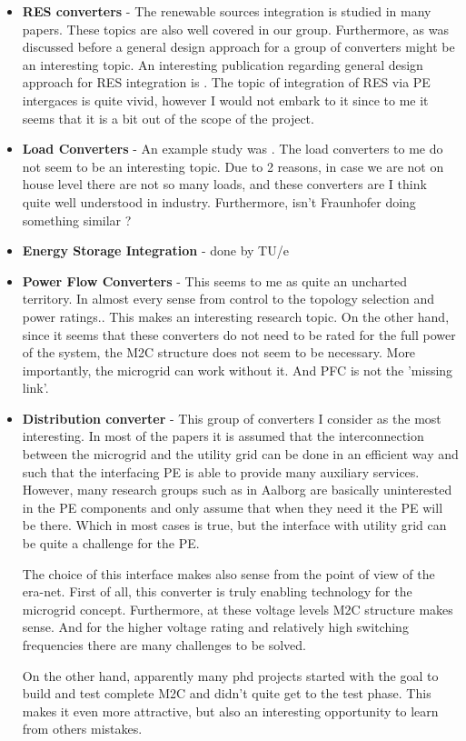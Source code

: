 \documentclass[]{scrartcl}
\begin{document}
\begin{itemize}
	\item \textbf{RES converters} - The renewable sources integration is  studied in many papers. These topics are also well covered in our group. Furthermore, as was discussed before a general design approach for a group of converters might be an interesting topic. An interesting publication regarding general design approach for RES integration is \cite{Ortjohann2009}. The topic of integration of RES via PE intergaces is quite vivid, however I would not embark to it since to me it seems that it is a bit out of the scope of the project.
	\item \textbf{Load Converters} - An example study was \cite{Lucia2013}.  The load converters to me do not seem to be an interesting topic. Due to 2 reasons, in case we are not on house level there are not so many loads, and these converters are I think quite well understood in industry. Furthermore, isn't Fraunhofer doing something similar ? 
	
	\item \textbf{Energy Storage Integration} - done by TU/e
	
	\item \textbf{Power Flow Converters} - This seems to me as quite an uncharted territory. In almost every sense from control to the topology selection and power ratings.. This makes an interesting research topic. On the other hand, since it seems that these converters do not need to be rated for the full power of the system, the M2C structure does not seem to be necessary. More importantly, the microgrid can work without it. And PFC is not the 'missing link'.
	
	\item \textbf{Distribution converter} - This group of converters I consider as the most interesting. In most of the papers it is assumed that the interconnection between the microgrid and the utility grid can be done in an efficient way and such that the interfacing PE is able to provide many auxiliary services. However, many research groups such as in Aalborg are basically uninterested in the PE components and only assume that when they need it the PE will be there. Which in most cases is true, but the interface with utility grid can be quite a challenge for  the PE. 
	
	The choice of this interface makes also sense from the point of view of the era-net. First of all, this converter is truly enabling technology for the microgrid concept. Furthermore, at these  voltage levels M2C structure makes sense. And for the higher voltage rating and relatively high switching frequencies there are many challenges to be solved. 
	
	On the other hand, apparently many phd projects started with the goal to build and test complete M2C and didn't quite get to the test phase. This makes it even more attractive, but also an interesting opportunity to learn from others mistakes.
	
\end{itemize}
\end{document}
